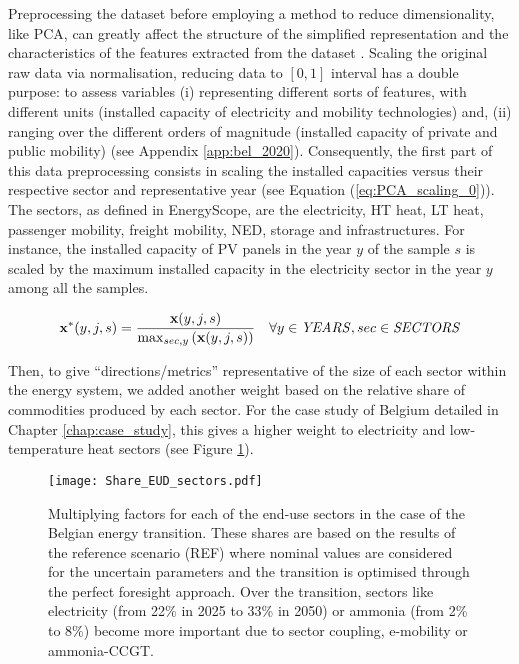 \noindent
Preprocessing the dataset before employing a method to reduce dimensionality, like \gls{PCA}, can greatly affect the structure of the simplified representation and the characteristics of the features extracted from the dataset \cite{parente2013principal,peerenboom2015dimension}. Scaling the original raw data via normalisation, \ie reducing data to $[0, 1]$ interval has a double purpose: to assess variables (i) representing different sorts of features, with different units (\eg installed capacity of electricity and mobility technologies) and, (ii) ranging over the different orders of magnitude (\eg installed capacity of private and public mobility) (see Appendix \ref{app:bel_2020}).  Consequently, the first part of this data preprocessing consists in scaling the installed capacities versus their respective sector and representative year (see Equation (\ref{eq:PCA_scaling_0})). The sectors, as defined in EnergyScope, are the electricity, \gls{HT} heat, \gls{LT} heat, passenger mobility, freight mobility, \gls{NED}, storage and infrastructures. For instance, the installed capacity of \gls{PV} panels in the year $y$ of the sample $s$ is scaled by the maximum installed capacity in the electricity sector in the year $y$ among all the samples.

\begin{equation}
 \label{eq:PCA_scaling_0}
\textbf{x}^{*}(y,j,s)=\frac{\textbf{x}(y,j,s)}{\mathrm{max}_{sec,y}\left(\textbf{x}(y,j,s)\right)}
 \quad \forall y \in \text{\emph{YEARS}}, sec \in \text{\emph{SECTORS}}
\end{equation}

Then, to give ``directions/metrics'' representative of the size of each sector within the energy system, we added another weight based on the relative share of commodities produced by each sector. For the case study of Belgium detailed in Chapter \ref{chap:case_study}, this gives a higher weight to electricity and low-temperature heat sectors (see Figure \ref{fig:Share_EUD_sectors}). 

\begin{figure}[!htbp]
\centering
\texttt{[image: Share\_EUD\_sectors.pdf]}
\caption{Multiplying factors for each of the end-use sectors in the case of the Belgian energy transition. These shares are based on the results of the reference scenario (REF) where nominal values are considered for the uncertain parameters and the transition is optimised through the perfect foresight approach. Over the transition, sectors like electricity (\ie from 22\% in 2025 to 33\% in 2050) or ammonia (\ie from 2\% to 8\%) become more important due to sector coupling, \eg e-mobility or ammonia-\gls{CCGT}.}
\label{fig:Share_EUD_sectors}
\end{figure}

